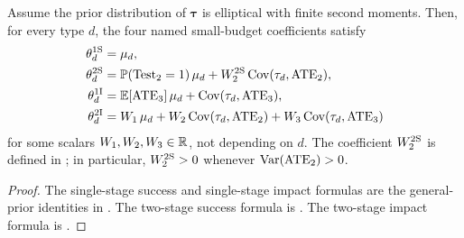 \begin{corollary}
  \label{cor:named-objective-elliptical-decompositions-appendix}
  Assume the prior distribution of \(\bm\tau\) is elliptical with finite second moments.
  Then, for every type \(d\), the four named small-budget coefficients satisfy
  \begin{align*}
    \theta_d^{\mathrm{1S}}
    &=
    \mu_d, \\
    \theta_d^{\mathrm{2S}}
    &=
    \mathbb{P}(\operatorname{Test}_2=1)\,\mu_d
    +
    W_2^{\mathrm{2S}}\,{\rm Cov}(\tau_d,\mathrm{ATE}_2), \\
    \theta_d^{\mathrm{1I}}
    &=
    \mathbb{E}[\mathrm{ATE}_3] \, \mu_d+
    {\rm Cov}(\tau_d,\mathrm{ATE}_3), \\
    \theta_d^{\mathrm{2I}}
    &=
    W_1\,\mu_d
    +
    W_2\,{\rm Cov}(\tau_d,\mathrm{ATE}_2)
    +
    W_3\,{\rm Cov}(\tau_d,\mathrm{ATE}_3)
  \end{align*}
  for some scalars \(W_1,W_2,W_3\in\mathbb{R}\), not depending on \(d\).
  The coefficient \(W_2^{\mathrm{2S}}\) is defined in ; in particular, \(W_2^{\mathrm{2S}}>0\) whenever \({\rm Var}(\mathrm{ATE}_2)>0\).
\end{corollary}

\begin{proof}
  The single-stage success and single-stage impact formulas are the general-prior identities in .
  The two-stage success formula is .
  The two-stage impact formula is .
\end{proof}
